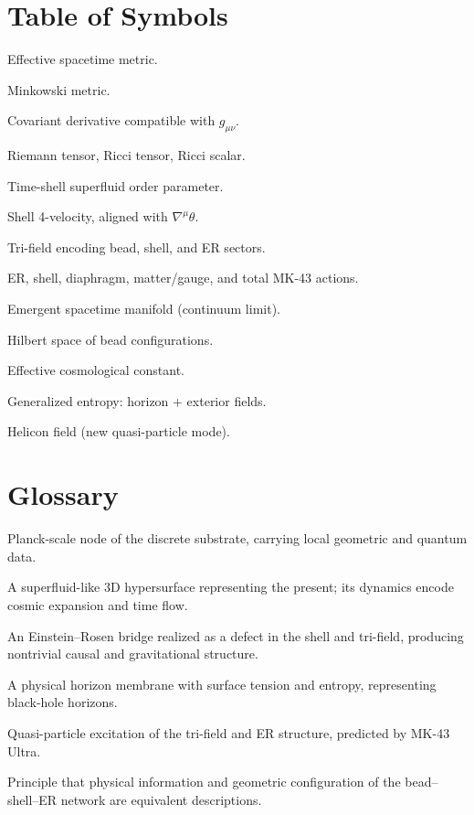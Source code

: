 \documentclass[11pt,oneside]{book}
\theoremstyle{definition}
\newcommand{\M}{\mathcal{M}}
\newcommand{\Hbead}{\mathcal{H}_{\text{bead}}}
\newcommand{\Ttri}{\mathcal{T}}
\newcommand{\Bhel}{h_{\mathrm{hel}}}
\newcommand{\Lambdaeff}{\Lambda_{\mathrm{eff}}}
\newcommand{\Sgen}{S_{\mathrm{gen}}}
\newcommand{\Sdiag}{S_{\mathrm{diag}}}
\newcommand{\SER}{S_{\mathrm{ER}}}
\newcommand{\Sshell}{S_{\mathrm{shell}}}
\newcommand{\Sfields}{S_{\mathrm{fields}}}
\newcommand{\SMK}{S_{\mathrm{MK43}}}
\begin{document}
\chapter*{Table of Symbols}

\begin{description}[leftmargin=2.5cm,style=nextline]
    \item[$g_{\mu\nu}$] Effective spacetime metric.
    \item[$\eta_{\mu\nu}$] Minkowski metric.
    \item[$\nabla_\mu$] Covariant derivative compatible with $g_{\mu\nu}$.
    \item[$R_{\mu\nu\rho\sigma}, R_{\mu\nu}, R$] Riemann tensor, Ricci tensor, Ricci scalar.
    \item[$\Phi = |\Phi| e^{i\theta}$] Time-shell superfluid order parameter.
    \item[$u^\mu$] Shell 4-velocity, aligned with $\nabla^\mu \theta$.
    \item[$\Ttri$] Tri-field encoding bead, shell, and ER sectors.
    \item[$\SER, \Sshell, \Sdiag, \Sfields, \SMK$] ER, shell, diaphragm, matter/gauge, and total MK-43 actions.
    \item[$\M$] Emergent spacetime manifold (continuum limit).
    \item[$\Hbead$] Hilbert space of bead configurations.
    \item[$\Lambdaeff$] Effective cosmological constant.
    \item[$\Sgen$] Generalized entropy: horizon + exterior fields.
    \item[$\Bhel$] Helicon field (new quasi-particle mode).
\end{description}

\chapter*{Glossary}

\begin{description}[style=nextline]
    \item[Bead] Planck-scale node of the discrete substrate, carrying local geometric and quantum data.
    \item[Time Shell] A superfluid-like 3D hypersurface representing the present; its dynamics encode cosmic expansion and time flow.
    \item[ER Bridge] An Einstein--Rosen bridge realized as a defect in the shell and tri-field, producing nontrivial causal and gravitational structure.
    \item[Diaphragm] A physical horizon membrane with surface tension and entropy, representing black-hole horizons.
    \item[Helicon] Quasi-particle excitation of the tri-field and ER structure, predicted by MK-43 Ultra.
    \item[Information = Geometry] Principle that physical information and geometric configuration of the bead--shell--ER network are equivalent descriptions.
\end{description}
\end{document}
